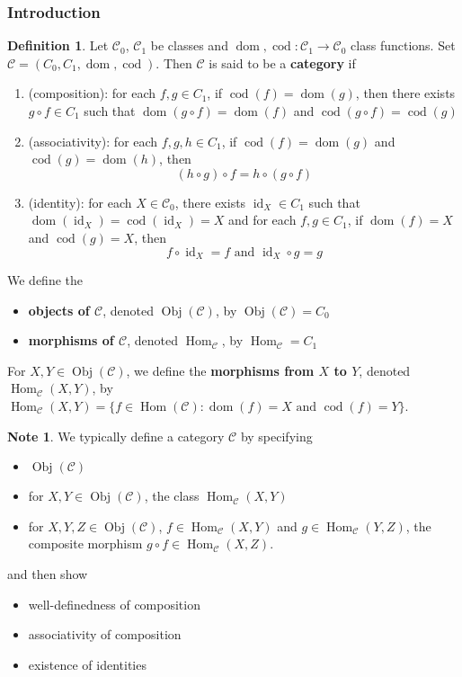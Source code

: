 \documentclass[12pt]{amsart}
\theoremstyle{definition}
\newtheorem{defn}[definition]{Definition}
\newtheorem{note}[definition]{Note}
\newcommand{\MC}{\mathcal{C}}
\DeclareMathOperator{\id}{id}
\DeclareMathOperator{\dom}{dom}
\DeclareMathOperator{\cod}{cod}
\DeclareMathOperator{\Obj}{Obj}
\DeclareMathOperator{\Hom}{Hom}
\DeclareMathOperator*{\0}{\mbf{0}}
\DeclareMathOperator*{\1}{\mbf{1}}
\newcommand{\ld}[1]{\label{defn:#1}}
\begin{document}
	\subsubsection{Introduction}
	
	\begin{defn}  \ld{12001}
		Let $\MC_0$, $\MC_1$ be classes and $\dom, \cod : \MC_1 \rightarrow \MC_0$ class functions. Set $\MC = (C_0, C_1, \dom, \cod)$. Then $\MC$ is said to be a \textbf{category} if 
		\begin{enumerate}
			\item (composition): for each $f,g \in C_1$, if $\cod(f) = \dom(g)$, then there exists $g \circ f \in C_1$ such that $\dom(g \circ f) = \dom(f)$ and $\cod(g \circ f) = \cod(g)$
			\item (associativity): for each $f,g,h \in C_1$, if $\cod(f) = \dom(g)$ and $\cod(g) = \dom(h)$, then $$(h \circ g) \circ f = h \circ (g \circ f)$$  
			\item (identity): for each $X \in \MC_0$, there exists $\id_{X} \in C_1$ such that $\dom(\id_X) = \cod(\id_X) = X$ and for each $f, g \in C_1$, if $\dom(f) = X$ and $\cod(g) = X$, then $$f \circ \id_X = f \text{ and } \id_X \circ g = g$$ 
		\end{enumerate}
		We define the
		\begin{itemize}
			\item \textbf{objects of $\MC$}, denoted $\Obj(\MC)$, by $\Obj(\MC) = C_0$
			\item \textbf{morphisms of $\MC$}, denoted $\Hom_{\MC}$, by $\Hom_{\MC} = C_1$
		\end{itemize}
		For $X, Y \in \Obj(\MC)$, we define the \textbf{morphisms from $X$ to $Y$}, denoted $\Hom_{\MC}(X, Y)$, by $\Hom_{\MC}(X, Y) = \{f \in \Hom(\MC): \dom(f) = X \text{ and } \cod(f) = Y\}$.
	\end{defn}

	\begin{note} 
		We typically define a category $\MC$ by specifying 
		\begin{itemize}
			\item $\Obj(\MC)$
			\item for $X,Y \in \Obj(\MC)$, the class $\Hom_{\MC}(X, Y)$
			\item for $X,Y,Z \in \Obj(\MC)$, $f \in \Hom_{\MC}(X, Y)$ and $g \in \Hom_{\MC}(Y, Z)$, the composite morphism $g \circ f \in \Hom_{\MC}(X,Z)$.
		\end{itemize}
		and then show 
		\begin{itemize}
			\item well-definedness of composition
			\item associativity of composition 
			\item existence of identities 
		\end{itemize}
	\end{note}
\end{document}
